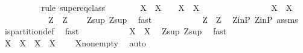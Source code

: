 \begin{isabellebody}
\ \ \ \ \ \ \ \ \isamarkupfalse%
\ {\isacharparenleft}rule\ super{\isacharunderscore}eq{\isacharunderscore}class{\isacharparenright}\isanewline
\ \ \ \ \ \ \isamarkupfalse%
\ {\isachardoublequoteopen}X{}\ {\isasyminter}\ X{}\ {\isasymnoteq}\ {\isacharbraceleft}{\isacharbraceright}\ {\isasymlongrightarrow}\ X{}\ {\isacharequal}\ X{}{\isachardoublequoteclose}\isanewline
\ \ \ \ \ \ \isamarkupfalse%
\isanewline
\ \ \ \ \ \ \ \ \isamarkupfalse%
\ {\isachardoublequoteopen}X{}\ {\isasyminter}\ X{}\ {\isasymnoteq}\ {\isacharbraceleft}{\isacharbraceright}{\isachardoublequoteclose}\isanewline
\ \ \ \ \ \ \ \ \isamarkupfalse%
\ \isamarkupfalse%
\ {\isachardoublequoteopen}Z{}\ {\isasyminter}\ Z{}\ {\isasymnoteq}\ {\isacharbraceleft}{\isacharbraceright}{\isachardoublequoteclose}\ \isamarkupfalse%
\ Z{}{\isacharunderscore}sup\ Z{}{\isacharunderscore}sup\ \isamarkupfalse%
\ fast\isanewline
\ \ \ \ \ \ \ \ \isamarkupfalse%
\ \isamarkupfalse%
\ {\isachardoublequoteopen}Z{}\ {\isacharequal}\ Z{}{\isachardoublequoteclose}\ \isamarkupfalse%
\ Z{}{\isacharunderscore}in{\isacharunderscore}P\ Z{}{\isacharunderscore}in{\isacharunderscore}P\ assms\ \isamarkupfalse%
\ is{\isacharunderscore}partition{\isacharunderscore}def\ \isamarkupfalse%
\ fast\isanewline
\ \ \ \ \ \ \ \ \isamarkupfalse%
\ \isamarkupfalse%
\ {\isachardoublequoteopen}X{}\ {\isacharequal}\ X{}{\isachardoublequoteclose}\ \isamarkupfalse%
\ Z{}{\isacharunderscore}sup\ Z{}{\isacharunderscore}sup\ \isamarkupfalse%
\ fast\isanewline
\ \ \ \ \ \ \isamarkupfalse%
\isanewline
\ \ \ \ \ \ \isamarkupfalse%
\ \isamarkupfalse%
\ {\isachardoublequoteopen}X{}\ {\isacharequal}\ X{}\ {\isasymlongrightarrow}\ X{}\ {\isasyminter}\ X{}\ {\isasymnoteq}\ {\isacharbraceleft}{\isacharbraceright}{\isachardoublequoteclose}\ \isamarkupfalse%
\ X{}{\isacharunderscore}non{\isacharunderscore}empty\ \isamarkupfalse%
\ auto\isanewline
\ \ \ \ \ \ \isamarkupfalse%
\ \isamarkupfalse%

\end{isabellebody}

